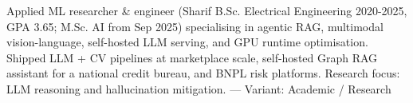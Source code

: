 \small{Applied ML researcher \& engineer (Sharif B.Sc. Electrical Engineering 2020-2025, GPA 3.65; M.Sc. AI from Sep 2025) specialising in agentic RAG, multimodal vision-language, self-hosted LLM serving, and GPU runtime optimisation. Shipped LLM + CV pipelines at marketplace scale, self-hosted Graph RAG assistant for a national credit bureau, and BNPL risk platforms. Research focus: LLM reasoning and hallucination mitigation.
 — Variant: Academic / Research}
